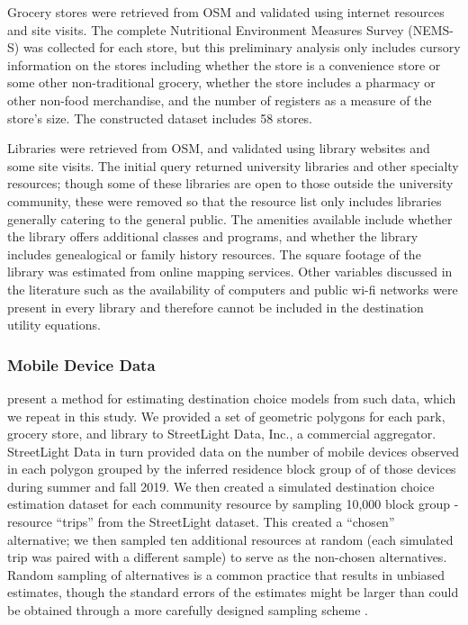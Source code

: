 \documentclass[3p, authoryear, review]{elsarticle} %
\begin{document}
Grocery stores were retrieved from OSM and validated using internet resources and
site visits. The complete Nutritional Environment Measures Survey (NEMS-S) \citep{glanz2007}
was collected for each store, but this preliminary analysis only includes
cursory information on the stores including whether the store is a convenience store
or some other non-traditional grocery, whether the store includes a pharmacy or
other non-food merchandise, and the number of registers as a measure of the
store's size. The constructed dataset includes 58 stores.

Libraries were retrieved from OSM, and validated using library websites and
some site visits. The initial query returned university libraries and other
specialty resources; though some of these libraries are open to those outside
the university community, these were removed so that the resource list only
includes libraries generally catering to the general public. The amenities
available include whether the library offers additional classes and programs,
and whether the library includes genealogical or family history resources. The
square footage of the library was estimated from online mapping services.
Other variables discussed in the literature such as the availability of computers
and public wi-fi networks were present in every library and therefore cannot
be included in the destination utility equations.

\hypertarget{mobile-device-data}{%
\subsubsection{Mobile Device Data}\label{mobile-device-data}}

\citet{alamedaparks} present a method for estimating destination choice models from
such data, which we repeat in this study. We provided a set of geometric
polygons for each park, grocery store, and library to StreetLight Data, Inc., a
commercial aggregator. StreetLight Data in turn provided data on the number of
mobile devices observed in each polygon grouped by the inferred residence block
group of of those devices during summer and fall 2019.
We then created a simulated destination choice estimation dataset for each
community resource by sampling 10,000 block group - resource ``trips'' from the
StreetLight dataset. This created a ``chosen'' alternative; we then sampled ten additional
resources at random (each simulated trip was paired with a different sample) to
serve as the non-chosen alternatives. Random sampling of alternatives is a
common practice that results in unbiased estimates, though the standard errors
of the estimates might be larger than could be obtained through a more carefully
designed sampling scheme \citep{train2009}.
\end{document}
